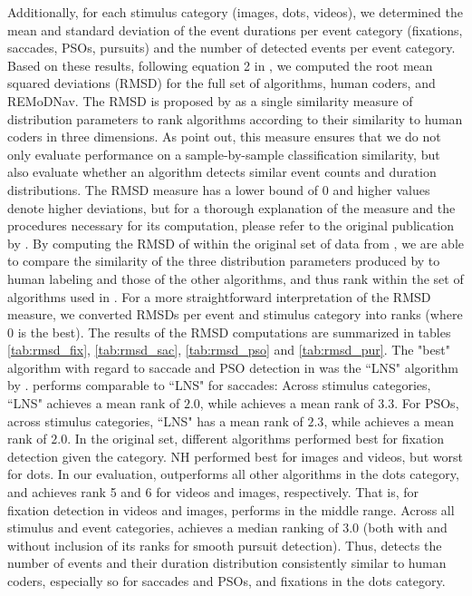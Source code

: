 Additionally, for each stimulus category (images, dots, videos), we determined
the mean and standard deviation of the event durations per event category (fixations,
saccades, PSOs, pursuits) and the number of detected events per event category.
Based on these results, following equation 2 in \citet{Andersson2017}, we computed
the root mean squared deviations (RMSD) for the full set of algorithms, human coders,
and REMoDNav. The RMSD is proposed by \cite{Andersson2017} as a single similarity
measure of distribution parameters to rank algorithms according to their similarity
to human coders in three dimensions. As \citet{Andersson2017} point out, this measure
ensures that we do not only evaluate performance on a sample-by-sample classification
similarity, but also evaluate whether an algorithm detects similar event counts and
duration distributions.
The RMSD measure has a lower bound of 0 and higher values denote
higher deviations, but for a thorough explanation of the measure and the procedures
necessary for its computation, please refer to the original publication by
\cite{Andersson2017}. By computing the RMSD of \remodnav within the original set
of data from \citet{Andersson2017}, we are able to compare the similarity of the
three distribution parameters produced by \remodnav to human labeling and those of
the other algorithms, and thus rank \remodnav within the set of algorithms used in
\citet{Andersson2017}.
For a more straightforward interpretation of the RMSD measure, we converted
RMSDs per event and stimulus category into ranks (where 0 is the best).
The results of the RMSD computations are summarized in tables \ref{tab:rmsd_fix},
\ref{tab:rmsd_sac}, \ref{tab:rmsd_pso} and \ref{tab:rmsd_pur}.
The "best" algorithm with regard to saccade and PSO detection in \cite{Andersson2017}
was the ``LNS" algorithm by \cite{Larsson2013}. \remodnav performs comparable to
``LNS" for saccades: Across stimulus categories, ``LNS" achieves a mean rank of $2.0$,
while \remodnav achieves a mean rank of $3.3$. For PSOs, across
stimulus categories, ``LNS" has a mean rank of $2.3$, while \remodnav achieves a
mean rank of $2.0$.
In the original set, different algorithms performed best for fixation detection
given the category. NH performed best for images  and videos, but worst for dots.
In our evaluation, \remodnav outperforms all other
algorithms in the dots category, and achieves rank 5 and 6 for videos and images,
respectively. That is, for fixation detection in videos and images, \remodnav
performs in the middle range. Across all stimulus and event categories,
\remodnav achieves a median ranking of $3.0$ (both with and without inclusion of
its ranks for smooth pursuit detection). Thus, \remodnav detects the number
of events and their duration distribution consistently similar to human coders,
especially so for saccades and PSOs, and fixations in the dots category.


